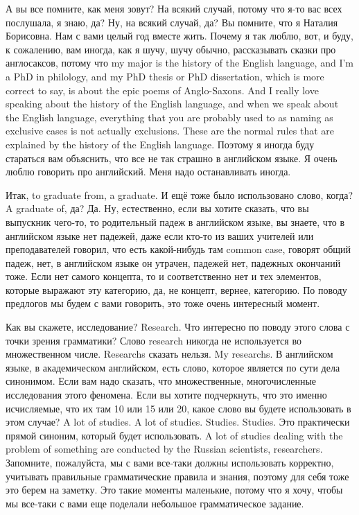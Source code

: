 \documentclass[main.tex]{subfiles}
\begin{document}
А вы все помните, как меня зовут?
На всякий случай, потому что я-то вас всех послушала, я знаю, да?
Ну, на всякий случай, да?
Вы помните, что я Наталия Борисовна.
Нам с вами целый год вместе жить.
Почему я так люблю, вот, и буду, к сожалению, вам иногда, как я шучу, шучу обычно, рассказывать сказки про англосаксов, потому что my major is the history of the English language, and I'm a PhD in philology, and my PhD thesis or PhD dissertation, which is more correct to say, is about the epic poems of Anglo-Saxons.
And I really love speaking about the history of the English language, and when we speak about the English language, everything that you are probably used to as naming as exclusive cases is not actually exclusions.
These are the normal rules that are explained by the history of the English language.
Поэтому я иногда буду стараться вам объяснить, что все не так страшно в английском языке.
Я очень люблю говорить про английский.
Меня надо останавливать иногда.

Итак, to graduate from, a graduate.
И ещё тоже было использовано слово, когда? A graduate of, да? Да.
Ну, естественно, если вы хотите сказать, что вы выпускник чего-то, то родительный падеж в английском языке, вы знаете, что в английском языке нет падежей, даже если кто-то из ваших учителей или преподавателей говорил, что есть какой-нибудь там common case, говорят общий падеж, нет, в английском языке он утрачен, падежей нет, падежных окончаний тоже.
Если нет самого концепта, то и соответственно нет и тех элементов, которые выражают эту категорию, да, не концепт, вернее, категорию.
По поводу предлогов мы будем с вами говорить, это тоже очень интересный момент.

Как вы скажете, исследование? Research.
Что интересно по поводу этого слова с точки зрения грамматики?
Слово research никогда не используется во множественном числе.
Researchs сказать нельзя.
My researchs.
В английском языке, в академическом английском, есть слово, которое является по сути дела синонимом.
Если вам надо сказать, что множественные, многочисленные исследования этого феномена.
Если вы хотите подчеркнуть, что это именно исчисляемые, что их там 10 или 15 или 20, какое слово вы будете использовать в этом случае?
A lot of studies.
A lot of studies.
Studies.
Studies.
Это практически прямой синоним, который будет использовать.
A lot of studies dealing with the problem of something are conducted by the Russian scientists, researchers.
Запомните, пожалуйста, мы с вами все-таки должны использовать корректно, учитывать правильные грамматические правила и знания, поэтому для себя тоже это берем на заметку.
Это такие моменты маленькие, потому что я хочу, чтобы мы все-таки с вами еще поделали небольшое грамматическое задание.
\end{document}
